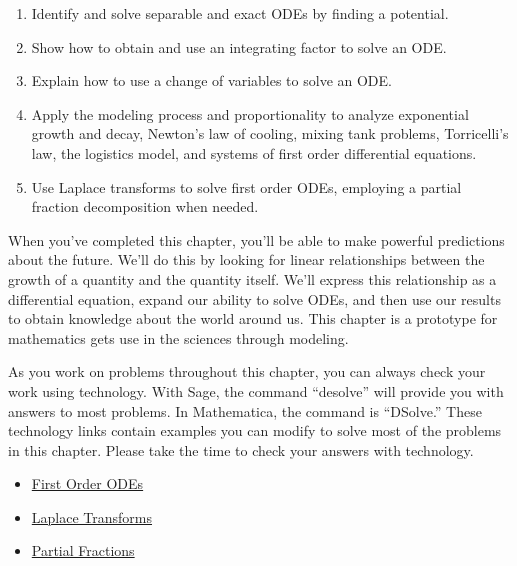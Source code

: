\begin{enumerate}
\item Identify and solve separable and exact ODEs by finding a potential. 
\item Show how to obtain and use an integrating factor to solve an ODE.
\item Explain how to use a change of variables to solve an ODE.
\item Apply the modeling process and proportionality to analyze exponential growth and decay, Newton's law of cooling, mixing tank problems, Torricelli's law, the logistics model, and systems of first order differential equations. 
\item Use Laplace transforms to solve first order ODEs, employing a partial fraction decomposition when needed.
\end{enumerate}
When you've completed this chapter, you'll be able to make powerful predictions about the future. We'll do this by looking for linear relationships between the growth of a quantity and the quantity itself. We'll express this relationship as a differential equation, expand our ability to solve ODEs, and then use our results to obtain knowledge about the world around us. This chapter is a prototype for mathematics gets use in the sciences through modeling.  

As you work on problems throughout this chapter, you can always check your work using technology.  With Sage, the command ``desolve'' will provide you with answers to most problems.  In Mathematica, the command is ``DSolve.''  These technology links contain examples you can modify to solve most of the problems in this chapter. Please take the time to check your answers with technology.

\begin{itemize}
 \item \href{\urlfirstorderodesolver}{First Order ODEs}
 \item \href{\urllaplacetransforms}{Laplace Transforms}
 \item \href{\urlpartialfraction}{Partial Fractions}
\end{itemize}


